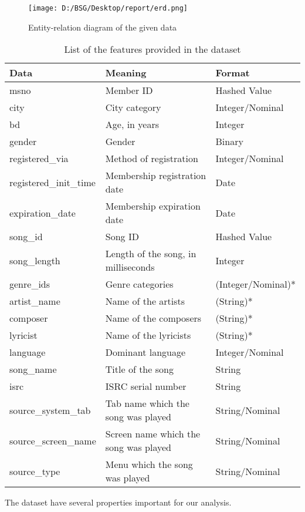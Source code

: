 \documentclass{article}
\begin{document}
\begin{figure}[!h]
  \texttt{[image: D:/BSG/Desktop/report/erd.png]}
  \caption{Entity-relation diagram of the given data}
  \label{fig:erd}
\end{figure}
\begin{table}[!h]
\centering
\begin{tabular}{|l|l|l|}
\hline \rowcolor[HTML]{C0C0C0}
Data & Meaning & Format \\\hline
msno & Member ID & Hashed Value \\\hline
city & City category & Integer/Nominal \\\hline
bd & Age, in years & Integer \\\hline
gender & Gender & Binary \\\hline
registered\_via & Method of registration & Integer/Nominal \\\hline
registered\_init\_time & Membership registration date & Date \\\hline
expiration\_date & Membership expiration date & Date \\\hline
song\_id & Song ID & Hashed Value \\\hline
song\_length & Length of the song, in milliseconds & Integer \\\hline
genre\_ids & Genre categories & (Integer/Nominal)* \\\hline
artist\_name & Name of the artists & (String)* \\\hline
composer & Name of the composers & (String)* \\\hline
lyricist & Name of the lyricists & (String)* \\\hline
language & Dominant language & Integer/Nominal \\\hline
song\_name & Title of the song & String \\\hline
isrc & ISRC serial number & String \\\hline
source\_system\_tab & Tab name which the song was played &String/Nominal\\\hline
source\_screen\_name & Screen name which the song was played&String/Nominal\\\hline
source\_type & Menu which the song was played & String/Nominal\\\hline
\end{tabular}
\caption{List of the features provided in the dataset}
\label{table:features}
\end{table}

The dataset have several properties important for our analysis.
\end{document}
